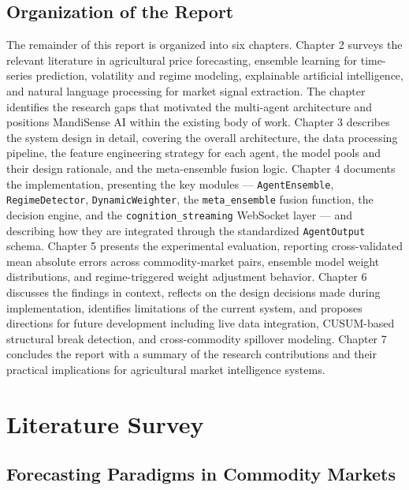 \documentclass[12pt,a4paper]{report}
\begin{document}
\section{Organization of the Report}

The remainder of this report is organized into six chapters. Chapter 2 surveys the relevant literature in agricultural price forecasting, ensemble learning for time-series prediction, volatility and regime modeling, explainable artificial intelligence, and natural language processing for market signal extraction. The chapter identifies the research gaps that motivated the multi-agent architecture and positions MandiSense AI within the existing body of work. Chapter 3 describes the system design in detail, covering the overall architecture, the data processing pipeline, the feature engineering strategy for each agent, the model pools and their design rationale, and the meta-ensemble fusion logic. Chapter 4 documents the implementation, presenting the key modules — \texttt{AgentEnsemble}, \texttt{RegimeDetector}, \texttt{DynamicWeighter}, the \texttt{meta\_ensemble} fusion function, the decision engine, and the \texttt{cognition\_streaming} WebSocket layer — and describing how they are integrated through the standardized \texttt{AgentOutput} schema. Chapter 5 presents the experimental evaluation, reporting cross-validated mean absolute errors across commodity-market pairs, ensemble model weight distributions, and regime-triggered weight adjustment behavior. Chapter 6 discusses the findings in context, reflects on the design decisions made during implementation, identifies limitations of the current system, and proposes directions for future development including live data integration, CUSUM-based structural break detection, and cross-commodity spillover modeling. Chapter 7 concludes the report with a summary of the research contributions and their practical implications for agricultural market intelligence systems.


\chapter{Literature Survey}

\section{Forecasting Paradigms in Commodity Markets}
\end{document}
